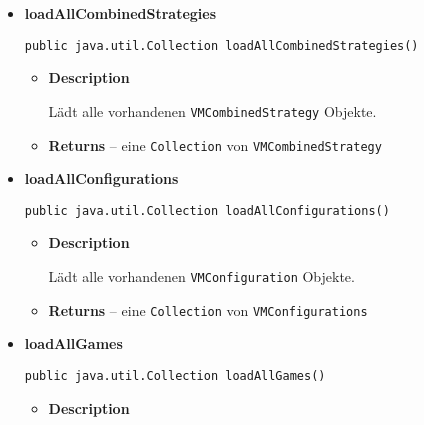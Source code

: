 {{{{{{\begin{itemize}
{\begin{itemize}
{Löscht das gespeicherte \texttt{\small VMResult} mit dem angegebenen Namen. Der Name entspricht der zugehörigen \texttt{\small Configuration} aus deren Simulation das Ergebnis entstanden ist.
}
\item{
{\bf  Parameters}
  \begin{itemize}
   \item{
\texttt{name} -- der Name des \texttt{\small VMResult}}
  \end{itemize}
}%
\end{itemize}
}%
\item{ 
\hypertarget{de.sswis.controller.FileManager.loadAllCombinedStrategies()}{{\bf  loadAllCombinedStrategies}\\}
\begin{lstlisting}[frame=none]
public java.util.Collection loadAllCombinedStrategies()\end{lstlisting} %
\begin{itemize}
\item{
{\bf  Description}

Lädt alle vorhandenen \texttt{\small VMCombinedStrategy} Objekte.
}
\item{{\bf  Returns} -- 
eine \texttt{\small Collection} von \texttt{\small VMCombinedStrategy} 
}%
\end{itemize}
}%
\item{ 
\hypertarget{de.sswis.controller.FileManager.loadAllConfigurations()}{{\bf  loadAllConfigurations}\\}
\begin{lstlisting}[frame=none]
public java.util.Collection loadAllConfigurations()\end{lstlisting} %
\begin{itemize}
\item{
{\bf  Description}

Lädt alle vorhandenen \texttt{\small VMConfiguration} Objekte.
}
\item{{\bf  Returns} -- 
eine \texttt{\small Collection} von \texttt{\small VMConfigurations} 
}%
\end{itemize}
}%
\item{ 
\hypertarget{de.sswis.controller.FileManager.loadAllGames()}{{\bf  loadAllGames}\\}
\begin{lstlisting}[frame=none]
public java.util.Collection loadAllGames()\end{lstlisting} %
\begin{itemize}
\item{
{\bf  Description}

}
\end{itemize}}
\end{itemize}}}}}}}
